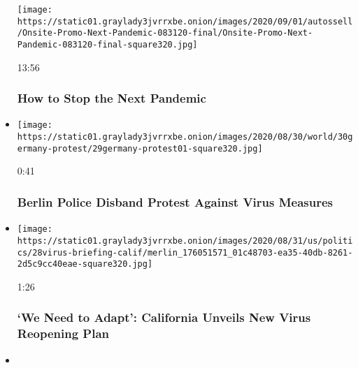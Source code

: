 \begin{itemize}
  \texttt{[image: https://static01.graylady3jvrrxbe.onion/images/2020/09/01/autossell/Onsite-Promo-Next-Pandemic-083120-final/Onsite-Promo-Next-Pandemic-083120-final-square320.jpg]}

  13:56

  \hypertarget{how-to-stop-the-next-pandemic}{%
  \subsubsection{How to Stop the Next
  Pandemic}\label{how-to-stop-the-next-pandemic}}
\item
  \href{https://www.nytimes3xbfgragh.onion/video/world/europe/100000007314799/germany-virus.html?action=click\&module=video-series-bar\&region=header\&pgtype=Article\&playlistId=video/coronavirus-news-update}{}

  \texttt{[image: https://static01.graylady3jvrrxbe.onion/images/2020/08/30/world/30germany-protest/29germany-protest01-square320.jpg]}

  0:41

  \hypertarget{berlin-police-disband-protest-against-virus-measures}{%
  \subsubsection{Berlin Police Disband Protest Against Virus
  Measures}\label{berlin-police-disband-protest-against-virus-measures}}
\item
  \href{https://www.nytimes3xbfgragh.onion/video/us/100000007314377/newsom-coronavirus-reopening-plan.html?action=click\&module=video-series-bar\&region=header\&pgtype=Article\&playlistId=video/coronavirus-news-update}{}

  \texttt{[image: https://static01.graylady3jvrrxbe.onion/images/2020/08/31/us/politics/28virus-briefing-calif/merlin\_176051571\_01c48703-ea35-40db-8261-2d5c9cc40eae-square320.jpg]}

  1:26

  \hypertarget{we-need-to-adapt-california-unveils-new-virus-reopening-plan}{%
  \subsubsection{`We Need to Adapt': California Unveils New Virus
  Reopening
  Plan}\label{we-need-to-adapt-california-unveils-new-virus-reopening-plan}}
\item
  \href{https://www.nytimes3xbfgragh.onion/video/us/politics/100000007312239/republican-national-convention-highlights.html?action=click\&module=video-series-bar\&region=header\&pgtype=Article\&playlistId=video/coronavirus-news-update}{}


\end{itemize}
